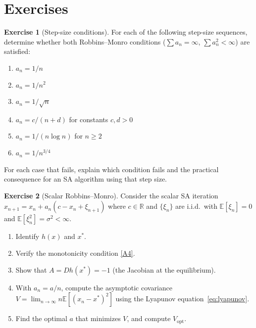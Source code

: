 \documentclass[11pt,a4paper]{article}
\theoremstyle{definition}
\newtheorem{exercise}{Exercise}[section]
\theoremstyle{plain}
\theoremstyle{remark}
\newcommand{\R}{\mathbb{R}}
\newcommand{\E}{\mathbb{E}}
\begin{document}
\section{Exercises}
\label{sec:exercises}

\begin{exercise}[Step-size conditions]
\label{ex:step-sizes}
For each of the following step-size sequences, determine whether both Robbins--Monro
conditions ($\sum a_n = \infty$, $\sum a_n^2 < \infty$) are satisfied:
\begin{enumerate}[label=(\alph*)]
\item $a_n = 1/n$
\item $a_n = 1/n^2$
\item $a_n = 1/\sqrt{n}$
\item $a_n = c/(n + d)$ for constants $c, d > 0$
\item $a_n = 1/(n \log n)$ for $n \geq 2$
\item $a_n = 1/n^{3/4}$
\end{enumerate}
For each case that fails, explain which condition fails and the practical
consequence for an SA algorithm using that step size.
\end{exercise}

\begin{exercise}[Scalar Robbins--Monro]
\label{ex:scalar-rm}
Consider the scalar SA iteration $x_{n+1} = x_n + a_n(c - x_n + \xi_{n+1})$ where
$c \in \R$ and $\{\xi_n\}$ are i.i.d.\ with $\E[\xi_n] = 0$ and
$\E[\xi_n^2] = \sigma^2 < \infty$.
\begin{enumerate}[label=(\alph*)]
\item Identify $h(x)$ and $x^*$.
\item Verify the monotonicity condition \ref{A4}.
\item Show that $A = Dh(x^*) = -1$ (the Jacobian at the equilibrium).
\item With $a_n = a/n$, compute the asymptotic covariance
  $V = \lim_{n \to \infty} n \E[(x_n - x^*)^2]$ using the Lyapunov
  equation~\eqref{eq:lyapunov}.
\item Find the optimal $a$ that minimizes $V$, and compute $V_{\mathrm{opt}}$.
\end{enumerate}
\end{exercise}
\end{document}
